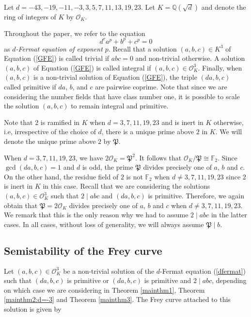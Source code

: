 \documentclass[]{article}
\newcommand {\QQ}{{\mathbb{Q}}}
\newcommand {\mcalO}{{\mathcal{O}}}
\newcommand {\mfp}{{\mathfrak{P}}}
\newcounter{cases}
\begin{document}
Let $d=-43, -19, -11,-3,3,5,7,11,13,19,23$. Let $K=\QQ(\sqrt{d})$ and denote the ring of integers of $K$ by $\mcalO_K$. 

Throughout the paper, we refer to the equation
\begin{equation*}\label{GFE}
    d^ra^p+b^p+c^p=0
\end{equation*} as \textit{$d$-Fermat equation of exponent $p$}. Recall that a solution $(a, b, c) \in K^3$ of Equation (\ref{GFE}) is called trivial if $abc = 0$ and non-trivial otherwise. A solution $(a, b, c)$ of Equation (\ref{GFE}) is called integral if $(a, b, c) \in \mcalO_K^3$. Finally, when $(a, b, c)$ is a non-trivial solution of Equation (\ref{GFE}), the triple $(da,b,c)$ called primitive if $da$, $b$, and $c$ are pairwise coprime. Note that since we are considering the number fields that have class number one, it is possible to scale the solution $(a, b, c)$ to remain integral and primitive.

Note that $2$ is ramified in $K$ when $d=3,7,11,19,23$ and is inert in $K$ otherwise, i.e, irrespective of the choice of $d$, there is a unique prime above $2$ in $K$. We will denote the unique prime above $2$ by $\mfp$.

When $d=3,7,11,19,23$, we have $2\mcalO_K=\mfp^2$. It follows that $\mcalO_K/\mfp \cong \mathbb{F}_2$. Since $\gcd(da,b,c)=1$ and $d$ is odd, the prime $\mfp$ divides precisely one of $a$, $b$ and $c$. On the other hand, the residue field of $2$ is not $\mathbb{F}_2$ when $d\ne 3,7,11,19,23$ since $2$ is inert in $K$ in this case. Recall that we are considering the solutions $(a,b,c)\in\mcalO_K^3$ such that $2\mid abc$ and $(da,b,c)$ is primitive. Therefore, we again obtain that $\mfp=2\mcalO_K$ divides precisely one of $a$, $b$ and $c$ when $d\ne 3,7,11,19,23$. We remark that this is the only reason why we had to assume $2\mid abc$ in the latter cases. In all cases, without loss of generality, we will always assume $\mfp\mid b$.

\subsection{Semistability of the Frey curve}
Let $(a,b,c)\in\mcalO_K^3$ be a non-trivial solution of the $d$-Fermat equation (\ref{dfermat}) such that $(da,b,c)$ is primitive or $(da,b,c)$ is primitive and $2\mid abc$, depending on which case we are considering in Theorem \ref{mainthm1}, Theorem \ref{mainthm2:d=-3} and Theorem \ref{mainthm3}. The Frey curve attached to this solution is given by
\end{document}
